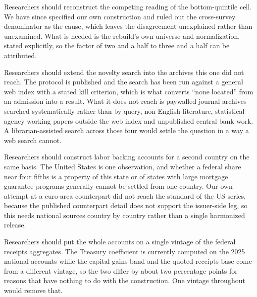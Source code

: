 \begin{description}[leftmargin=2.4em,style=nextline]
  \item[FR6] Researchers should reconstruct the competing reading of the bottom-quintile
  cell. We have since specified our own construction and ruled out the cross-survey
  denominator as the cause, which leaves the disagreement unexplained rather than
  unexamined. What is needed is the rebuild's own universe and normalization, stated
  explicitly, so the factor of two and a half to three and a half can be attributed.

  \item[FR7] Researchers should extend the novelty search into the archives this one did not
  reach. The protocol is published and the search has been run against a general web index with
  a stated kill criterion, which is what converts ``none located'' from an admission into a
  result. What it does not reach is paywalled journal archives searched systematically rather
  than by query, non-English literature, statistical agency working papers outside the web index
  and unpublished central bank work. A librarian-assisted search across those four would settle
  the question in a way a web search cannot.

  \item[FR8] Researchers should construct labor backing accounts for a second country on the same
  basis. The United States is one observation, and whether a federal share near four fifths is a
  property of this state or of states with large mortgage guarantee programs generally cannot
  be settled from one country. Our own attempt at a euro-area counterpart did not reach the
  standard of the US series, because the published counterpart detail does not support the
  issuer-side leg, so this needs national sources country by country rather than a single
  harmonized release.

  \item[FR9] Researchers should put the whole accounts on a single vintage of the federal
  receipts aggregates. The Treasury coefficient is currently computed on the 2025 national
  accounts while the capital-gains band and the quoted receipts base come from a different
  vintage, so the two differ by about two percentage points for reasons that have nothing to do
  with the construction. One vintage throughout would remove that.

\end{description}
